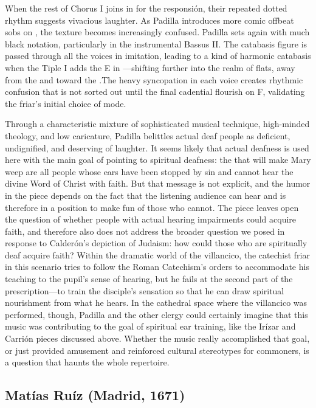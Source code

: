 When the rest of Chorus I joins in for the responsión, their repeated dotted rhythm suggests vivacious laughter.
As Padilla introduces more comic offbeat sobs on , the texture becomes increasingly confused.
Padilla sets  again with much black notation, particularly in the instrumental Bassus II.
The catabasis figure is passed through all the voices in imitation, leading to a kind of harmonic catabasis when the Tiple I adds the E\fl{} in ---shifting further into the realm of flats, away from the  and toward the .\citXXX[chafe?]
The heavy syncopation in each voice creates rhythmic confusion that is not sorted out until the final cadential flourish on F, validating the friar's initial choice of mode.

Through a characteristic mixture of sophisticated musical technique, high-minded theology, and low caricature, Padilla belittles actual deaf people as deficient, undignified, and deserving of laughter.
It seems likely that actual deafness is used here with the main goal of pointing to spiritual deafness: the  that will make Mary weep are all people whose ears have been stopped by sin and cannot hear the divine Word of Christ with faith.
But that message is not explicit, and the humor in the piece depends on the fact that the listening audience can hear and is therefore in a position to make fun of those who cannot.
The piece leaves open the question of whether people with actual hearing impairments could acquire faith, and therefore also does not address the broader question we posed in response to Calderón's depiction of Judaism: how could those who are spiritually deaf acquire faith?
Within the dramatic world of the villancico, the catechist friar in this scenario tries to follow the Roman Catechism's orders to accommodate his teaching to the pupil's sense of hearing, but he fails at the second part of the prescription---to train the disciple's sensation so that he can draw spiritual nourishment from what he hears.
In the cathedral space where the villancico was performed, though, Padilla and the other clergy could certainly imagine that this music was contributing to the goal of spiritual ear training, like the Irízar and Carrión pieces discussed above.
Whether the music really accomplished that goal, or just provided amusement and reinforced cultural stereotypes for commoners, is a question that haunts the whole repertoire.

\subsection{Matías Ruíz (Madrid, 1671)}

